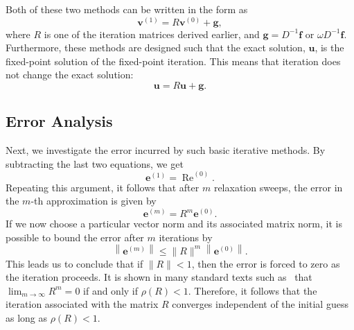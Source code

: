 \documentclass[letterpaper,12pt]{article}
\begin{document}
Both of these two methods can be written in the form as \begin{equation}
\mathbf{v}^{(1)}=R \mathbf{v}^{(0)}+\mathbf{g},
\end{equation}
where $R$ is one of the iteration matrices derived earlier, and $\mathbf{g}= D^{-1} \mathbf{f}$ or $ \omega D^{-1} \mathbf{f}$. Furthermore, these methods are designed such that the exact solution, $\mathbf{u}$, is the fixed-point solution of the fixed-point iteration. This means that iteration does not change the exact solution:
\begin{equation}
\mathbf{u}=R \mathbf{u}+\mathbf{g}.
\end{equation}






\subsection{Error Analysis}
Next, we investigate the error incurred by such basic iterative methods. By subtracting the last two equations, we get
\begin{equation}
\mathbf{e}^{(1)}=\operatorname{Re}^{(0)}.
\end{equation}
Repeating this argument, it follows that after $m$ relaxation sweeps, the error in the $m$-th approximation is given by
\begin{equation}
\mathbf{e}^{(m)}=R^{m} \mathbf{e}^{(0)}.
\end{equation}
If we now choose a particular vector norm and its associated matrix norm, it is possible to bound the error after $m$ iterations by
\begin{equation}
\left\|\mathbf{e}^{(m)}\right\| \leq\|R\|^{m}\left\|\mathbf{e}^{(0)}\right\|.
\end{equation}
This leads us to conclude that if $\|R\|<1$, then the error is forced to zero as the iteration proceeds. It is shown in many standard texts such as~\cite{saad2003iterative} that
$\lim_{m \rightarrow \infty} R^{m}=0$ if and only if $\rho(R)<1$. Therefore, it follows that the iteration associated with the matrix $R$ converges independent of the initial guess as long as $\rho(R)<1$.
\end{document}
